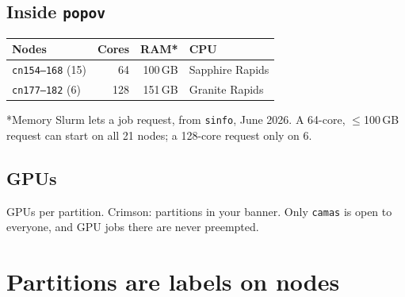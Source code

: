 \documentclass[10pt,letterpaper]{article}
\begin{document}
\begin{minipage}[t]{0.47\textwidth}
\subsection{Inside \texttt{popov}}
\small
\begin{tabularx}{\linewidth}{@{}l r r X@{}}
\toprule
\textbf{Nodes} & \textbf{Cores} & \textbf{RAM*} & \textbf{CPU}\\
\midrule
\texttt{cn154--168} (15) & 64 & 100\,GB & Sapphire Rapids\\
\texttt{cn177--182} (6) & 128 & 151\,GB & Granite Rapids\\
\bottomrule
\end{tabularx}\par\vspace{3pt}
{\scriptsize\color{wsugray}*Memory Slurm lets a job request, from \texttt{sinfo}, June 2026. A 64-core, $\le$100\,GB request can start on all 21 nodes; a 128-core request only on 6.}
\end{minipage}\hfill
\begin{minipage}[t]{0.47\textwidth}
\subsection{GPUs}
\par
{\scriptsize\color{wsugray}GPUs per partition. Crimson: partitions in your banner. Only \texttt{camas} is open to everyone, and GPU jobs there are never preempted.}
\end{minipage}

\section{Partitions are labels on nodes}
\end{document}
